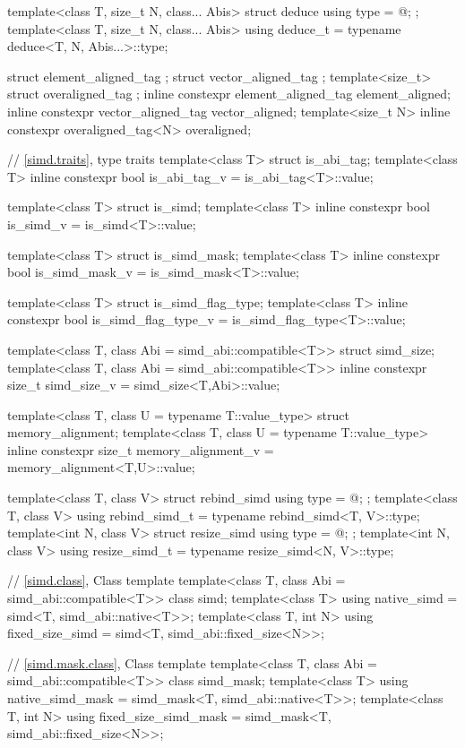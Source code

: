 \begin{wgText}
\begin{codeblock}
{{{    template<class T, size_t N, class... Abis> struct deduce { using type = @\seebelow@; };
    template<class T, size_t N, class... Abis> using deduce_t =
      typename deduce<T, N, Abis...>::type;
  }

  struct element_aligned_tag {};
  struct vector_aligned_tag {};
  template<size_t> struct overaligned_tag {};
  inline constexpr element_aligned_tag element_aligned{};
  inline constexpr vector_aligned_tag vector_aligned{};
  template<size_t N> inline constexpr overaligned_tag<N> overaligned{};

  // \ref{simd.traits},  type traits
  template<class T> struct is_abi_tag;
  template<class T> inline constexpr bool is_abi_tag_v = is_abi_tag<T>::value;

  template<class T> struct is_simd;
  template<class T> inline constexpr bool is_simd_v = is_simd<T>::value;

  template<class T> struct is_simd_mask;
  template<class T> inline constexpr bool is_simd_mask_v = is_simd_mask<T>::value;

  template<class T> struct is_simd_flag_type;
  template<class T> inline constexpr bool is_simd_flag_type_v =
    is_simd_flag_type<T>::value;

  template<class T, class Abi = simd_abi::compatible<T>> struct simd_size;
  template<class T, class Abi = simd_abi::compatible<T>>
    inline constexpr size_t simd_size_v = simd_size<T,Abi>::value;

  template<class T, class U = typename T::value_type> struct memory_alignment;
  template<class T, class U = typename T::value_type>
    inline constexpr size_t memory_alignment_v = memory_alignment<T,U>::value;

  template<class T, class V> struct rebind_simd { using type = @\seebelow@; };
  template<class T, class V> using rebind_simd_t = typename rebind_simd<T, V>::type;
  template<int N, class V> struct resize_simd { using type = @\seebelow@; };
  template<int N, class V> using resize_simd_t = typename resize_simd<N, V>::type;

  // \ref{simd.class}, Class template 
  template<class T, class Abi = simd_abi::compatible<T>> class simd;
  template<class T> using native_simd = simd<T, simd_abi::native<T>>;
  template<class T, int N> using fixed_size_simd = simd<T, simd_abi::fixed_size<N>>;

  // \ref{simd.mask.class}, Class template 
  template<class T, class Abi = simd_abi::compatible<T>> class simd_mask;
  template<class T> using native_simd_mask = simd_mask<T, simd_abi::native<T>>;
  template<class T, int N> using fixed_size_simd_mask =
    simd_mask<T, simd_abi::fixed_size<N>>;

}}
\end{codeblock}
\end{wgText}
